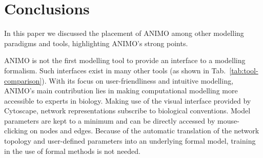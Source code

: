 \documentclass{bmcart}
\begin{document}
\section*{Conclusions}
%
%

In this paper we discussed the placement of ANIMO among other modelling paradigms and tools,
highlighting ANIMO's strong points.

ANIMO is not the first modelling tool to provide an interface to a
modelling formalism. Such interfaces exist in many other tools (as shown in Tab.~\ref{tab:tool-comparison}). With its
focus on user-friendliness and intuitive modelling, ANIMO's main contribution lies
in making computational modelling more accessible to experts in biology.
Making use of the visual
interface provided by Cytoscape, network representations subscribe to biological conventions.
Model parameters are kept to a minimum and can be directly accessed by mouse-clicking on
nodes and edges. Because of the automatic translation of the network topology and
user-defined parameters into an underlying formal model, training in the use of formal methods
is not needed.
\end{document}
